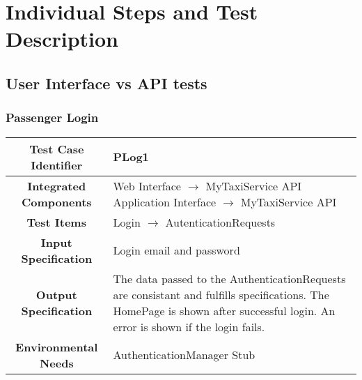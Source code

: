 \documentclass[11pt, a4paper,titlepage]{article}
\begin{document}
	\section{Individual Steps and Test Description}
	\subsection{User Interface vs API tests}
	\subsubsection{Passenger Login}
	\begin{tabularx}{\textwidth}{| c|X|}
		\hline \textbf{Test Case Identifier} & \label{PLog1}PLog1 \\
		\hline \textbf{Integrated Components} & Web Interface $\rightarrow $ MyTaxiService API \newline 
		Application Interface $\rightarrow $ MyTaxiService API \\
		\hline \textbf{Test Items} & Login $\rightarrow $ AutenticationRequests	 \\
		\hline \textbf{Input Specification} & Login email and password \\
		\hline \textbf{Output Specification} & 
		The data passed to the AuthenticationRequests are consistant and fulfills specifications.\newline
		The HomePage is shown after successful login.\newline
		An error is shown if the login fails. \\
		\hline \textbf{Environmental Needs} & AuthenticationManager Stub
		\\
		\hline
	\end{tabularx}
	\newline
	\newline
\end{document}
